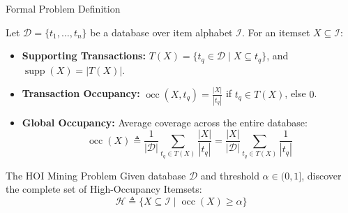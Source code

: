 \documentclass[aspectratio=169,10pt]{beamer}
\newcommand{\supp}{\operatorname{supp}}
\newcommand{\occ}{\operatorname{occ}}
\begin{document}
\begin{frame}{Formal Problem Definition}
  \begin{definition}
    Let $\mathcal{D} = \{t_1, \dots, t_n\}$ be a database over item alphabet $\mathcal{I}$. For an itemset $X \subseteq \mathcal{I}$:
    \begin{itemize}
      \item \textbf{Supporting Transactions:} $T(X) = \{t_q \in \mathcal{D} \mid X \subseteq t_q\}$, and $\supp(X) = |T(X)|$.
      \item \textbf{Transaction Occupancy:} $\occ(X, t_q) = \frac{|X|}{|t_q|}$ if $t_q \in T(X)$, else $0$.
      \item \textbf{Global Occupancy:} Average coverage across the entire database:
      $$\occ(X) \triangleq \frac{1}{|\mathcal{D}|} \sum_{t_q \in T(X)} \frac{|X|}{|t_q|} = \frac{|X|}{|\mathcal{D}|} \sum_{t_q \in T(X)} \frac{1}{|t_q|}$$
    \end{itemize}
  \end{definition}

  \begin{block}{The HOI Mining Problem}
    Given database $\mathcal{D}$ and threshold $\alpha \in (0, 1]$, discover the complete set of High-Occupancy Itemsets:
    $$\mathcal{H} \triangleq \{X \subseteq \mathcal{I} \mid \occ(X) \ge \alpha\}$$
  \end{block}
\end{frame}
\end{document}
